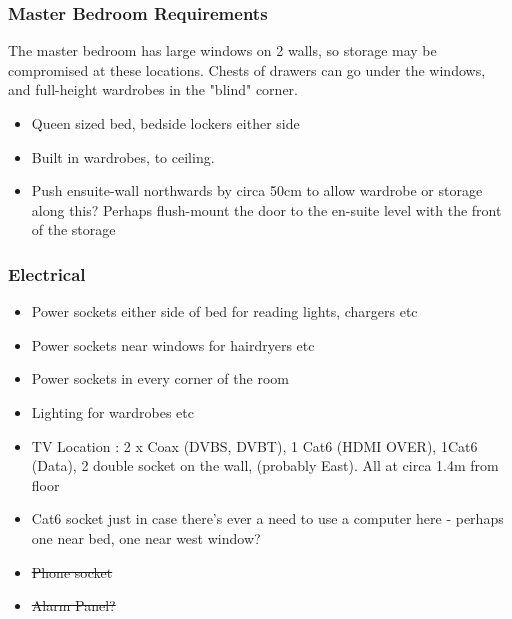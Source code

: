 \subsubsection{Master Bedroom Requirements}
The master bedroom has large windows on 2 walls, so storage may be compromised at these locations. 
Chests of drawers can go under the windows, and full-height wardrobes in the "blind" corner.

\begin{itemize}
\item Queen sized bed, bedside lockers either side
\item Built in wardrobes, to ceiling.
\item Push ensuite-wall northwards by circa 50cm to allow wardrobe or storage along this? Perhaps flush-mount the door to the en-suite level with the front of the storage

\end{itemize}

\subsubsection{Electrical}
\begin{itemize}
\item Power sockets either side of bed for reading lights, chargers etc
\item Power sockets near windows for hairdryers etc
\item Power sockets in every corner of the room
\item Lighting for wardrobes etc
\item TV Location : 2 x Coax (DVBS, DVBT), 1 Cat6 (HDMI OVER), 1Cat6 (Data), 2 double socket on the wall, (probably East). All at circa 1.4m from floor
\item Cat6 socket just in case there's ever a need to use a computer here - perhaps one near bed, one near west window?
\item \sout{Phone socket}
\item \sout{Alarm Panel?}
\end{itemize}
